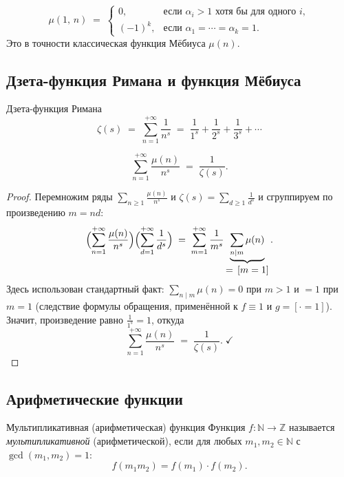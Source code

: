 \begin{Corollary}{}{}
	\[
	\mu(1,\, n) \;=\;
	\begin{cases}
		0,        & \text{если } \alpha_i > 1 \text{ хотя бы для одного } i,\\
		(-1)^{k}, & \text{если } \alpha_1 = \cdots = \alpha_k = 1.
	\end{cases}
	\]
	Это в точности классическая функция Мёбиуса $\mu(n)$.
\end{Corollary}

\subsection{Дзета-функция Римана и функция Мёбиуса}

\begin{Definition}{Дзета-функция Римана}{}
	\[
	\zeta(s) \;=\; \sum_{n=1}^{+\infty} \frac{1}{n^s}
	\;=\; \frac{1}{1^s} + \frac{1}{2^s} + \frac{1}{3^s} + \cdots
	\]
\end{Definition}

\begin{Theorem}{}{}
	\[
	\sum_{n=1}^{+\infty} \frac{\mu(n)}{n^s} \;=\; \frac{1}{\zeta(s)}.
	\]
\end{Theorem}

\begin{proof}
	Перемножим ряды $\sum_{n \geq 1}\frac{\mu(n)}{n^s}$ и $\zeta(s) = \sum_{d \geq 1}\frac{1}{d^s}$ и сгруппируем по произведению $m = nd$:
	\[
	\Bigl(\sum_{n=1}^{+\infty} \frac{\mu(n)}{n^s}\Bigr)
	\Bigl(\sum_{d=1}^{+\infty} \frac{1}{d^s}\Bigr)
	\;=\;
	\sum_{m=1}^{+\infty} \frac{1}{m^s}
	\underbrace{\sum_{n \mid m} \mu(n)}_{\displaystyle =\, [m = 1]}.
	\]
	Здесь использован стандартный факт: $\sum_{n \mid m}\mu(n) = 0$ при $m > 1$ и $= 1$ при $m = 1$
	(следствие формулы обращения, применённой к $f \equiv 1$ и $g = [{\cdot} = 1]$). Значит,
	произведение равно $\frac{1}{1^s} = 1$, откуда
	\[
	\sum_{n=1}^{+\infty} \frac{\mu(n)}{n^s}
	\;=\; \frac{1}{\zeta(s)}.\;\checkmark
	\]
\end{proof}

\subsection{Арифметические функции}

\begin{Definition}{Мультипликативная (арифметическая) функция}{}
	Функция $f \colon \mathbb{N} \to \mathbb{Z}$ называется
	\emph{мультипликативной} (арифметической), если для любых
	$m_1, m_2 \in \mathbb{N}$ с $\gcd(m_1, m_2) = 1$:
	\[
	f(m_1 m_2) = f(m_1)\cdot f(m_2).
	\]
\end{Definition}

